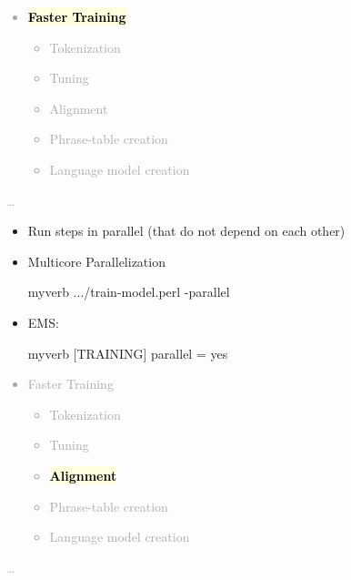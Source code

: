 \documentclass[landscape]{uedslides2C}
\newcommand{\currenttopic}[1]{\colorbox{lightyellow}{\textcolor{black}{\bf #1}}}
\begin{document}
\vspace{-5mm}
\textcolor{darkgrey}{
\begin{itemize} \itemsep -1mm
\item \currenttopic{Faster Training}
  \begin{itemize}
  \item Tokenization
  \item Tuning
  \item Alignment
  \item Phrase-table creation
  \item Language model creation
  \end{itemize}
\end{itemize}
\ldots
}



\begin{itemize} \itemsep 10mm
\vspace{10mm}
\item Run steps in parallel (that do not depend on each other)

\item {Multicore Parallelization}\\[4mm]
\begin{SaveVerbatim}{myverb} 
  .../train-model.perl -parallel
\end{SaveVerbatim}
\colorbox{gray}{}

\item EMS: \\[4mm]
\begin{SaveVerbatim}{myverb} 
  [TRAINING]
  parallel = yes
\end{SaveVerbatim}
\colorbox{gray}{}

\end{itemize}



\vspace{-5mm}
\textcolor{darkgrey}{
\begin{itemize} \itemsep -1mm
\item Faster Training
  \begin{itemize}
  \item Tokenization
  \item Tuning
  \item \currenttopic{Alignment}
  \item Phrase-table creation
  \item Language model creation
  \end{itemize}
\end{itemize}
\ldots
}
\end{document}
